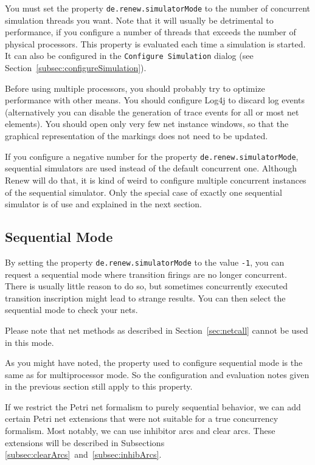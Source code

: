 You must set the property \texttt{de.renew.simulatorMode}
to the number of concurrent simulation threads you want.
Note that it will usually be detrimental to
performance, if you configure a number of threads that exceeds the number of
physical processors.
This property is evaluated each time a simulation is started.
It can also be configured in the \texttt{Configure Simulation}
dialog (see Section~\ref{subsec:configureSimulation}).

Before using multiple processors, you should probably try
to optimize performance with other means. You should configure Log4j to
discard log events (alternatively you can disable the generation of
trace events for all or most net elements). You should open
only very few net instance windows, so that the graphical
representation of the markings does not need to be updated.



If you configure a negative number for the property
\texttt{de.renew.simulatorMode}, sequential simulators are used
instead of the default concurrent one.
Although Renew will do that, it is kind of weird to configure multiple
concurrent instances of the sequential simulator.
Only the special case of exactly one sequential simulator is of use and
explained in the next section.


\subsection{Sequential Mode}\label{subsec:seqmode}

By setting the property \texttt{de.renew.simulatorMode} to the value \texttt{-1},
you can request a sequential mode where transition
firings are no longer concurrent.
There is usually little reason to do so, but sometimes
concurrently executed transition inscription might
lead to strange results. You can then select the sequential 
mode to check your nets.

Please note that net methods as described in
Section~\ref{sec:netcall} cannot be used in this mode.

As you might have noted, the property used to configure sequential
mode is the same as for multiprocessor mode.
So the configuration and evaluation notes given in the previous
section still apply to this property.

If we restrict the Petri net formalism to purely
sequential behavior, we can add certain Petri net extensions 
that were not suitable for a true concurrency formalism.
Most notably, we can use inhibitor arcs and clear arcs. 
These extensions will be described in Subsections
\ref{subsec:clearArcs}~and~\ref{subsec:inhibArcs}.


